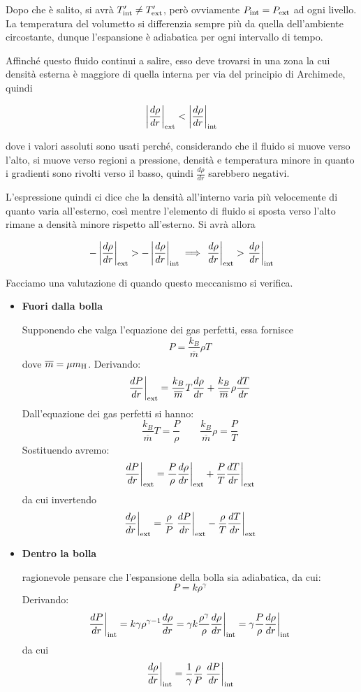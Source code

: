 Dopo che è salito, si avrà $T'_{\rm int} \neq T'_{\rm ext}$, però ovviamente $P_{\rm int}=P_{\rm ext}$ ad ogni livello. La temperatura del volumetto si differenzia sempre più da quella dell'ambiente circostante, dunque l'espansione è adiabatica per ogni intervallo di tempo.

Affinché questo fluido continui a salire, esso deve trovarsi in una zona la cui densità esterna è maggiore di quella interna per via del principio di Archimede, quindi

$$\left| \frac{d\rho}{dr} \right|_{\rm ext}<\left| \frac{d\rho}{dr} \right|_{\rm int}$$

dove i valori assoluti sono usati perché, considerando che il fluido si muove verso l'alto, si muove verso regioni a pressione, densità e temperatura minore in quanto i gradienti sono rivolti verso il basso, quindi $\frac{d\rho}{dr}$ sarebbero negativi.

L'espressione quindi ci dice che la densità all'interno varia più velocemente di quanto varia all'esterno, così mentre l'elemento di fluido si sposta verso l'alto rimane a densità minore rispetto all'esterno. Si avrà allora

$$-\left| \frac{d\rho}{dr} \right|_{\rm ext}>-\left| \frac{d\rho}{dr} \right|_{\rm int}
\implies
\left. \frac{d\rho}{dr} \right|_{\rm ext}>\left. \frac{d\rho}{dr} \right|_{\rm int}$$


Facciamo una valutazione di quando questo meccanismo si verifica.

\begin{itemize}
    \item \textbf{Fuori dalla bolla}
    
    Supponendo che valga l'equazione dei gas perfetti, essa fornisce
    $$P=\frac{k_B}{\overline{m}}\rho T$$
    dove $\overline{m}=\mu m_{\rm H}$. Derivando:
    $$\frac{dP}{dr}\bigg|_{\rm ext}=\frac{k_B}{\overline{m}}T\frac{d\rho}{dr}+\frac{k_B}{\overline{m}}\rho \frac{dT}{dr}$$
    Dall'equazione dei gas perfetti si hanno:
    $$\frac{k_B}{\overline{m}}T=\frac{P}{\rho}\qquad \frac{k_B}{\overline{m}}\rho=\frac{P}{T}$$
    Sostituendo avremo:
    $$\frac{dP}{dr}\bigg|_{\rm ext}=\frac{P}{\rho}\frac{d\rho}{dr}\bigg|_{\rm ext} + \frac{P}{T}\frac{dT}{dr}\bigg|_{\rm ext}$$
    da cui invertendo
    $$\left. \frac{d\rho}{dr} \right|_{\rm ext}
    =\frac{\rho}{P}\left. \frac{dP}{dr} \right|_{\rm ext} - \frac{\rho}{T}\frac{dT}{dr}\bigg|_{\rm ext}$$
    \item \textbf{Dentro la bolla}
    
    \E ragionevole pensare che l'espansione della bolla sia adiabatica, da cui:
    $$P=k\rho^\gamma$$
    Derivando:
    $$\frac{dP}{dr}\bigg|_{\rm int}
    =k\gamma\rho^{\gamma-1}\frac{d\rho}{dr}
    =\gamma k\frac{\rho^\gamma}{\rho}\frac{d\rho}{dr}\bigg|_{\rm int}
    =\gamma\frac{P}{\rho}\frac{d\rho}{dr}\bigg|_{\rm int}$$
    da cui
    $$\left.\frac{d\rho}{dr} \right|_{\rm int}
    =\frac{1}{\gamma} \frac{\rho}{P} \left. \frac{dP}{dr} \right|_{\rm int}$$
\end{itemize}

